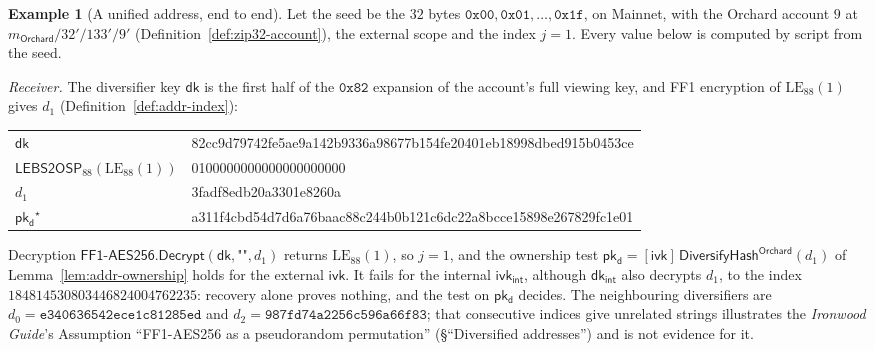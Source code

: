 \documentclass[11pt,a4paper]{article}
\theoremstyle{definition}
\newtheorem{example}[theorem]{Example}
\newcommand{\ivk}{\ensuremath{\mathsf{ivk}}}
\newcommand{\dk}{\ensuremath{\mathsf{dk}}}
\newcommand{\pkd}{\ensuremath{\mathsf{pk_d}}}
\begin{document}
\begin{example}[A unified address, end to end]\label{ex:ua-trace}
Let the seed be the $32$ bytes $\mathtt{0x00}, \mathtt{0x01}, \dots,
\mathtt{0x1f}$, on Mainnet, with the Orchard account $9$ at
$m_{\mathsf{Orchard}}/32'/133'/9'$ (Definition~\ref{def:zip32-account}),
the external scope and the index $j = 1$. Every value below is computed by
script from the seed.

\emph{Receiver.} The diversifier key $\dk$ is the first half of the
$\mathtt{0x82}$ expansion of the account's full viewing key, and FF1
encryption of $\mathrm{LE}_{88}(1)$ gives $d_1$
(Definition~\ref{def:addr-index}):
\begin{center}\footnotesize\ttfamily
\begin{tabular}{@{}l@{\quad}l@{}}
$\dk$ & 82cc9d79742fe5ae9a142b9336a98677b154fe20401eb18998dbed915b0453ce \\
$\mathsf{LEBS2OSP}_{88}(\mathrm{LE}_{88}(1))$ & 0100000000000000000000 \\
$d_1$ & 3fadf8edb20a3301e8260a \\
$\pkd^{\star}$
  & a311f4cbd54d7d6a76baac88c244b0b121c6dc22a8bcce15898e267829fc1e01 \\
\end{tabular}
\end{center}
Decryption $\mathsf{FF1\text{-}AES256.Decrypt}(\dk, \texttt{""}, d_1)$
returns $\mathrm{LE}_{88}(1)$, so $j = 1$, and the ownership test
$\pkd = [\ivk]\,\mathsf{DiversifyHash}^{\mathsf{Orchard}}(d_1)$ of
Lemma~\ref{lem:addr-ownership} holds for the external $\ivk$. It fails for
the internal $\ivk_{\mathsf{int}}$, although $\dk_{\mathsf{int}}$ also
decrypts $d_1$, to the index $184814530803446824004762235$: recovery alone
proves nothing, and the test on $\pkd$ decides. The neighbouring
diversifiers are $d_0 = \mathtt{e340636542ece1c81285ed}$ and
$d_2 = \mathtt{987fd74a2256c596a66f83}$; that consecutive indices give
unrelated strings illustrates the \emph{Ironwood Guide}'s Assumption
``FF1-AES256 as a pseudorandom permutation'' (\S``Diversified addresses'') and
is not evidence for it.


\end{example}
\end{document}
